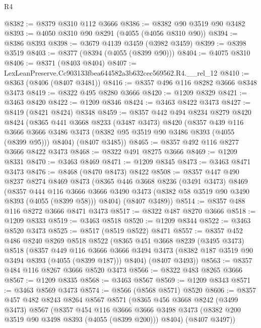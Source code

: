 \begin{lexlean}{R4}
\begin{coremodule}
@8382 := @8379 @8310 @112 @3666
@8386 := @8382 @90 @3519 @90 @3482
@8393 := @4050 @8310 @90 @8291 (@4055 (@4056 @8310 @90))
@8394 := @8386 @8393
@8398 := @3679 @4139 @3459 (@3982 @3459)
@8399 := @8398 @3519
@8403 := @8377 (@8394 (@4055 (@8399 @90)))
@8404 := @4075 @8310
@8406 := @8371 (@8403 @8404)
@8407 := LexLeanPreserve.Cc903133fbea644582a3b632cec569562.R4.__rel_12
@8410 := @8363 (@8406 (@8407 @3481))
@8416 := @8357 @496 @116 @8282 @3666 @8348 @3473
@8419 := @8322 @495 @8280 @3666
@8420 := @1209 @8329
@8421 := @3463 @8420
@8422 := @1209 @8346
@8424 := @3463 @8422 @3473
@8427 := @8419 (@8421 @8424) @8348
@8459 := @8357
    @442
    @494
    @8234
    @8279
    @8420
    @8424
    (@8365
      @441
      @3668
      @8233
      (@3487 @3473)
      @8420
      (@8357
        @439
        @116
        @3666
        @3666
        @3486
        @3473
        (@8382 @95 @3519 @90 @3486 @8393 (@4055 (@8399 @95)))
        @8404)
      (@8407 @3485))
@8465 := @8357 @492 @116 @8277 @3666 @8422 @3473
@8468 := @8322 @491 @8275 @3666
@8469 := @1209 @8331
@8470 := @3463 @8469
@8471 := @1209 @8345
@8473 := @3463 @8471 @3473
@8476 := @8468 (@8470 @8473) @8422
@8508 := @8357
    @447
    @490
    @8237
    @8274
    @8469
    @8473
    (@8365
      @446
      @3668
      @8236
      (@3491 @3473)
      @8469
      (@8357
        @444
        @116
        @3666
        @3666
        @3490
        @3473
        (@8382 @58 @3519 @90 @3490 @8393 (@4055 (@8399 @58)))
        @8404)
      (@8407 @3489))
@8514 := @8357 @488 @116 @8272 @3666 @8471 @3473
@8517 := @8322 @487 @8270 @3666
@8518 := @1209 @8333
@8519 := @3463 @8518
@8520 := @1209 @8344
@8522 := @3463 @8520 @3473
@8525 := @8517 (@8519 @8522) @8471
@8557 := @8357
    @452
    @486
    @8240
    @8269
    @8518
    @8522
    (@8365
      @451
      @3668
      @8239
      (@3495 @3473)
      @8518
      (@8357
        @449
        @116
        @3666
        @3666
        @3494
        @3473
        (@8382 @187 @3519 @90 @3494 @8393 (@4055 (@8399 @187)))
        @8404)
      (@8407 @3493))
@8563 := @8357 @484 @116 @8267 @3666 @8520 @3473
@8566 := @8322 @483 @8265 @3666
@8567 := @1209 @8335
@8568 := @3463 @8567
@8569 := @1209 @8343
@8571 := @3463 @8569 @3473
@8574 := @8566 (@8568 @8571) @8520
@8606 := @8357
    @457
    @482
    @8243
    @8264
    @8567
    @8571
    (@8365
      @456
      @3668
      @8242
      (@3499 @3473)
      @8567
      (@8357
        @454
        @116
        @3666
        @3666
        @3498
        @3473
        (@8382 @200 @3519 @90 @3498 @8393 (@4055 (@8399 @200)))
        @8404)
      (@8407 @3497))

\end{coremodule}
\end{lexlean}
